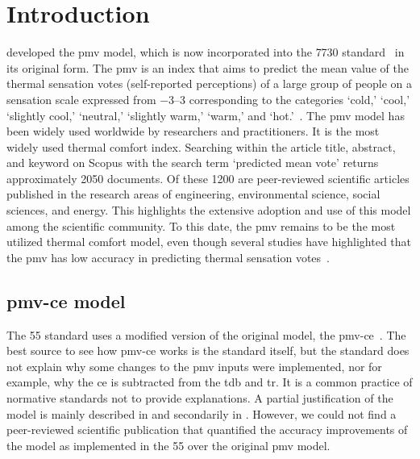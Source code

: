 \section{Introduction}\label{sec:introduction}
 developed the \ac{pmv} model, which is now incorporated into the \gls{7730} standard~\cite{iso7730} in its original form.
The \ac{pmv} is an index that aims to predict the mean value of the thermal sensation votes (self-reported perceptions) of a large group of people on a sensation scale expressed from \numrange{-3}{3} corresponding to the categories `cold,' `cool,' `slightly cool,' `neutral,' `slightly warm,' `warm,' and `hot.'~\cite{iso7730, ashrae552023}.
The \ac{pmv} model has been widely used worldwide by researchers and practitioners.
It is the most widely used thermal comfort index.
Searching within the article title, abstract, and keyword on Scopus with the search term `predicted mean vote' returns approximately \num{2050} documents.
Of these \num{1200} are peer-reviewed scientific articles published in the research areas of engineering, environmental science, social sciences, and energy.
This highlights the extensive adoption and use of this model among the scientific community.
To this date, the \ac{pmv} remains to be the most utilized thermal comfort model, even though several studies have highlighted that the \ac{pmv} has low accuracy in predicting thermal sensation votes~\cite{Cheung2019, Yao2022, Humphreys2002, doherty_evaluation_1988}.

\subsection{\ac{pmv-ce} model}\label{subsec:pmv-ce-limitations}
The \gls{55} standard uses a modified version of the original model, the \ac{pmv-ce}~\cite{ashrae552023}.
The best source to see how \ac{pmv-ce} works is the standard itself, but the standard does not explain why some changes to the \ac{pmv} inputs were implemented, nor for example, why the \ac{ce} is subtracted from the \ac{tdb} and \ac{tr}. It is a common practice of normative standards not to provide explanations.
A partial justification of the model is mainly described in  and secondarily in .
However, we could not find a peer-reviewed scientific publication that quantified the accuracy improvements of the model as implemented in the \gls{55} over the original \ac{pmv} model.

